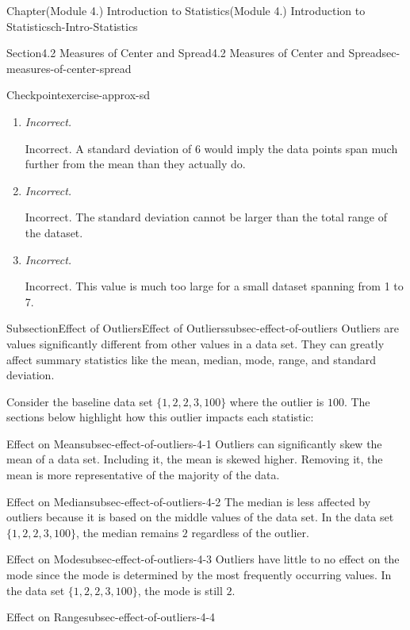 \documentclass[oneside,10pt,]{book}
\newcommand{\lititle}[1]{{\slshape#1}}
\begin{document}
\begin{chapterptx}{Chapter}{(Module 4.) Introduction to Statistics}{}{(Module 4.) Introduction to Statistics}{}{}{ch-Intro-Statistics}
\begin{sectionptx}{Section}{4.2 Measures of Center and Spread}{}{4.2 Measures of Center and Spread}{}{}{sec-measures-of-center-spread}
\begin{inlineexercise}{Checkpoint}{}{exercise-approx-sd}
\begin{enumerate}[label={\Alph*.}]
\item{}\lititle{Incorrect.}\par%
Incorrect. A standard deviation of 6 would imply the data points span much further from the mean than they actually do.%
\item{}\lititle{Incorrect.}\par%
Incorrect. The standard deviation cannot be larger than the total range of the dataset.%
\item{}\lititle{Incorrect.}\par%
Incorrect. This value is much too large for a small dataset spanning from 1 to 7.%
\end{enumerate}
%
\end{inlineexercise}%
%
%
\typeout{************************************************}
\typeout{************************************************}
%
\begin{subsectionptx}{Subsection}{Effect of Outliers}{}{Effect of Outliers}{}{}{subsec-effect-of-outliers}
Outliers are values significantly different from other values in a data set. They can greatly affect summary statistics like the mean, median, mode, range, and standard deviation.%
\par
Consider the baseline data set \(\{1, 2, 2, 3, 100\}\) where the outlier is \(100\). The sections below highlight how this outlier impacts each statistic:%
%
\begin{descriptionlist}
\begin{dlimedium}{Effect on Mean}{subsec-effect-of-outliers-4-1}%
Outliers can significantly skew the mean of a data set. Including it, the mean is skewed higher. Removing it, the mean is more representative of the majority of the data.%
\end{dlimedium}%
\begin{dlimedium}{Effect on Median}{subsec-effect-of-outliers-4-2}%
The median is less affected by outliers because it is based on the middle values of the data set. In the data set \(\{1, 2, 2, 3, 100\}\), the median remains \(2\) regardless of the outlier.%
\end{dlimedium}%
\begin{dlimedium}{Effect on Mode}{subsec-effect-of-outliers-4-3}%
Outliers have little to no effect on the mode since the mode is determined by the most frequently occurring values. In the data set \(\{1, 2, 2, 3, 100\}\), the mode is still \(2\).%
\end{dlimedium}%
\begin{dlimedium}{Effect on Range}{subsec-effect-of-outliers-4-4}%

\end{dlimedium}
\end{descriptionlist}
\end{subsectionptx}
\end{sectionptx}
\end{chapterptx}
\end{document}
